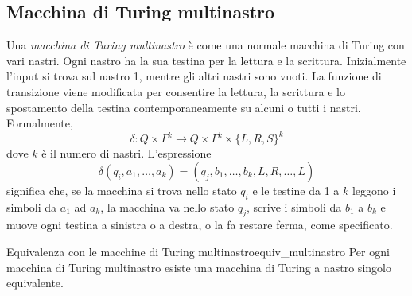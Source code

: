 \documentclass[12pt]{report}
\newcounter{theorem}
\newcommand{\nmu}{}
\begin{document}
\subsection{Macchina di Turing multinastro}
Una \textit{macchina di Turing multinastro} è come una normale macchina di Turing con vari nastri. Ogni nastro ha la sua testina per la lettura e la scrittura. Inizialmente l'input si trova sul nastro 1, mentre gli altri nastri sono vuoti. La funzione di transizione viene modificata per consentire la lettura, la scrittura e lo spostamento della testina contemporaneamente su alcuni o tutti i nastri. Formalmente,
\[
\delta: Q \times \Gamma^k \to Q \times \Gamma^k  \times \{L, R, S\}^k
\]
dove $k$ è il numero di nastri. L'espressione
\[
\delta(q_i, a_1, \dots, a_k) = (q_j, b_1, \dots, b_k, L, R, \dots, L)
\]
significa che, se la macchina si trova nello stato $q_i$ e le testine da 1 a $k$ leggono i simboli da $a_1$ ad $a_k$, la macchina va nello stato $q_j$, scrive i simboli da $b_1$ a $b_k$ e muove ogni testina a sinistra o a destra, o la fa restare ferma, come specificato.
\begin{theorem}{\nmu Equivalenza con le macchine di Turing multinastro}{equiv_multinastro}
	Per ogni macchina di Turing multinastro esiste una macchina di Turing a nastro singolo equivalente.
\end{theorem}
\end{document}
